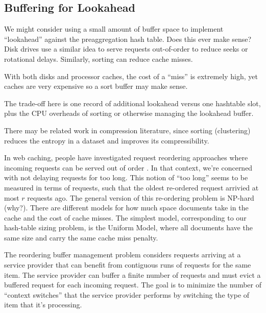 \documentclass[12pt]{article}
\begin{document}

\subsection{Buffering for Lookahead}

We might consider using a small amount of buffer space to implement ``lookahead'' against the preaggregation hash table.
Does this ever make sense?
Disk drives use a similar idea to serve requests out-of-order to reduce seeks or rotational delays.
Similarly, sorting can reduce cache misses.

With both disks and processor caches, the cost of a ``miss'' is extremely high, yet caches are very expensive so a sort buffer may make sense.

The trade-off here is one record of additional lookahead versus one hashtable slot, plus the CPU overheads of sorting or otherwise managing the lookahead buffer.

There may be related work in compression literature, since sorting (clustering) reduces the entropy in a dataset and improves its compressibility.

In web caching, people have investigated request reordering approaches where incoming requests can be served out of order \cite{web-caching-new-results}.  In that context, we're concerned with not delaying requests for too long.  This notion of ``too long'' seems to be measured in terms of requests, such that the oldest re-ordered request arrivied at most $r$ requests ago.  The general version of this re-ordering problem is NP-hard (why?).  There are different models for how much space documents take in the cache and the cost of cache misses.  The simplest model, corresponding to our hash-table sizing problem, is the Uniform Model, where all documents have the same size and carry the same cache miss penalty.

The reordering buffer management problem \cite{online-scheduling-for-sorting-buffers} considers requests arriving at a service provider that can benefit from contiguous runs of requests for the same item.  The service provider can buffer a finite number of requests and must evict a buffered request for each incoming request.  The goal is to minimize the number of ``context switches'' that the service provider performs by switching the type of item that it's processing.
\end{document}
